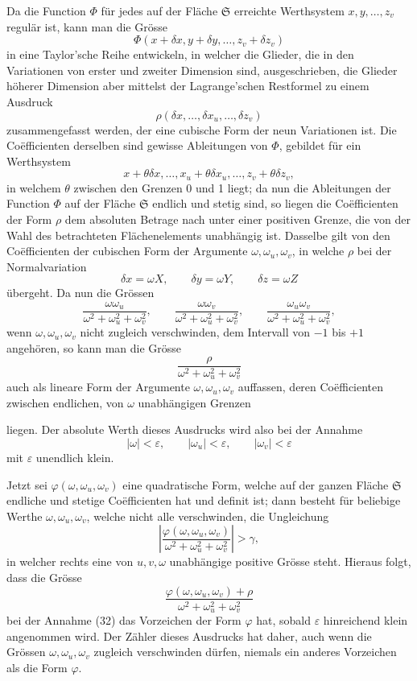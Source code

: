 \documentclass[11pt,a4paper,leqno]{article}
\begin{document}
Da die Function $\Phi$ für jedes auf der Fläche $\mathfrak{S}$ erreichte
Werthsystem $x,y,\ldots,z_v$ regulär ist, kann man die Grösse
\[
\Phi(x+\delta x,y+\delta y,\ldots,z_v+\delta z_v)
\]
in eine Taylor'sche Reihe entwickeln, in welcher die Glieder, die in den
Variationen von erster und zweiter Dimension sind, ausgeschrieben, die
Glieder höherer Dimension aber mittelst der Lagrange'schen Restformel zu
einem Ausdruck
\[
\rho(\delta x,\ldots,\delta x_u,\ldots,\delta z_v)
\]
zusammengefasst werden, der eine cubische Form der neun Variationen ist. Die
Coëfficienten derselben sind gewisse Ableitungen von $\Phi$, gebildet für ein
Werthsystem
\[
x+\theta\delta x,\ldots,x_u+\theta\delta x_u,\ldots,
z_v+\theta\delta z_v,
\]
in welchem $\theta$ zwischen den Grenzen 0 und 1 liegt; da nun die Ableitungen
der Function $\Phi$ auf der Fläche $\mathfrak{S}$ endlich und stetig sind, so
liegen die Coëfficienten der Form $\rho$ dem absoluten Betrage nach unter
einer positiven Grenze, die von der Wahl des betrachteten Flächenelements
unabhängig ist. Dasselbe gilt von den Coëfficienten der cubischen Form der
Argumente $\omega,\omega_u,\omega_v$, in welche $\rho$ bei der
Normalvariation
\begin{equation}\tag{31}
\delta x=\omega X,\qquad \delta y=\omega Y,\qquad \delta z=\omega Z
\end{equation}
übergeht. Da nun die Grössen
\[
\frac{\omega\omega_u}{\omega^2+\omega_u^2+\omega_v^2},\qquad
\frac{\omega\omega_v}{\omega^2+\omega_u^2+\omega_v^2},\qquad
\frac{\omega_u\omega_v}{\omega^2+\omega_u^2+\omega_v^2},
\]
wenn $\omega,\omega_u,\omega_v$ nicht zugleich verschwinden, dem Intervall
von $-1$ bis $+1$ angehören, so kann man die Grösse
\[
\frac{\rho}{\omega^2+\omega_u^2+\omega_v^2}
\]
auch als lineare Form der Argumente $\omega,\omega_u,\omega_v$ auffassen,
deren Coëfficienten zwischen endlichen, von $\omega$ unabhängigen Grenzen

liegen. Der absolute Werth dieses Ausdrucks wird also bei der Annahme
\begin{equation}\tag{32}
|\omega|<\varepsilon,\qquad |\omega_u|<\varepsilon,\qquad
|\omega_v|<\varepsilon
\end{equation}
mit $\varepsilon$ unendlich klein.

Jetzt sei $\varphi(\omega,\omega_u,\omega_v)$ eine quadratische Form, welche
auf der ganzen Fläche $\mathfrak{S}$ endliche und stetige Coëfficienten hat
und definit ist; dann besteht für beliebige Werthe
$\omega,\omega_u,\omega_v$, welche nicht alle verschwinden, die Ungleichung
\[
\left|\frac{\varphi(\omega,\omega_u,\omega_v)}
{\omega^2+\omega_u^2+\omega_v^2}\right|>\gamma,
\]
in welcher rechts eine von $u,v,\omega$ unabhängige positive Grösse steht.
Hieraus folgt, dass die Grösse
\[
\frac{\varphi(\omega,\omega_u,\omega_v)+\rho}
{\omega^2+\omega_u^2+\omega_v^2}
\]
bei der Annahme (32) das Vorzeichen der Form $\varphi$ hat, sobald
$\varepsilon$ hinreichend klein angenommen wird. Der Zähler dieses Ausdrucks
hat daher, auch wenn die Grössen $\omega,\omega_u,\omega_v$ zugleich
verschwinden dürfen, niemals ein anderes Vorzeichen als die Form $\varphi$.
\end{document}
